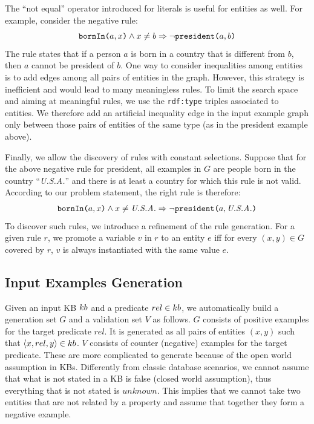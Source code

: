 \vspace{0.5ex}
The ``not equal'' operator introduced for literals is useful for entities as well. 
For example, consider the negative rule:
$$ \texttt{bornIn(}a,x\texttt{)} \wedge x \neq b \Rightarrow \neg \texttt{president(}a,b\texttt{)} $$
The rule states that if a person $a$ is born in a country that is different from $b$, then $a$ cannot be president of $b$.
One way to consider inequalities among entities is to add edges among all pairs of entities in the graph. However, this strategy is inefficient and would lead to many meaningless rules. To limit the search space and aiming at meaningful rules, we use the \texttt{rdf:type} triples associated to entities. We therefore add an artificial inequality edge in the input example graph only between those pairs of entities of the same type (as in the president example above). %

\vspace{0.5ex}
Finally, we allow the discovery of rules with constant selections. %
Suppose that for the above negative rule for president, all examples in $G$ are people born in the country ``\textit{U.S.A.}'' and there is at least a country for which this rule is not valid. According to our problem statement, the right rule is therefore:
%
$$ \texttt{bornIn(}a,x\texttt{)} \wedge x \neq \emph{U.S.A.} \Rightarrow \neg \texttt{president(}a,\emph{U.S.A.}\texttt{)} $$
%
To discover such rules, we introduce a refinement of the rule generation.
For a given rule $r$, we promote a variable $v$ in $r$ to an entity $e$ iff for every $(x,y) \in G$ covered by $r$, $v$ is always instantiated with the same value $e$. 


\subsection{Input Examples Generation} \label{sec:ex_generation}
Given an input KB ${\sc kb}$ and a predicate $rel \in {\sc kb}$, we automatically build a generation set $G$ and a validation set $V$ as follows. 
$G$ consists of positive examples for the target predicate $rel$. It is generated as all pairs of entities $(x,y)$ such that $\langle x,rel,y\rangle \in {\sc kb}$.
$V$ consists of counter (negative) examples for the target predicate.
These are more complicated to generate because of the open world assumption in KBs. 
Differently from classic database scenarios, we cannot assume that what is not stated in a KB is false (closed world assumption), thus everything that is not stated is $unknown$.%
This implies that we cannot take two entities that are not related by a property and assume that together they form a negative example. 

